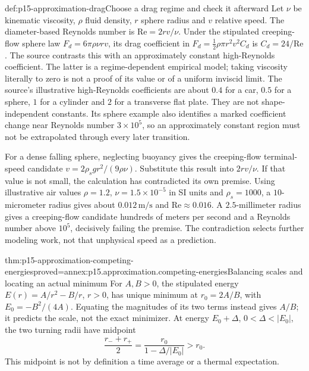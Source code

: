 \begin{hbexample}{def:p15-approximation-drag}{Choose a drag regime and check it afterward}
Let \(\nu\) be kinematic viscosity, \(\rho\) fluid density, \(r\) sphere
radius and \(v\) relative speed. The diameter-based Reynolds number is
\(\mathrm{Re}=2rv/\nu\). Under the stipulated creeping-flow sphere law
\(F_d=6\pi\rho\nu rv\), its drag coefficient in
\(F_d=\tfrac12\rho\pi r^2v^2C_d\) is \(C_d=24/\mathrm{Re}\).
The source contrasts this with an approximately constant high-Reynolds
coefficient. The latter is a regime-dependent empirical model; taking
viscosity literally to zero is not a proof of its value or of a uniform
inviscid limit. The source's illustrative high-Reynolds coefficients are
about \(0.4\) for a car, \(0.5\) for a sphere, \(1\) for a cylinder and
\(2\) for a transverse flat plate. They are not shape-independent constants.
Its sphere example also identifies a marked coefficient change near
Reynolds number \(3\times10^5\), so an approximately constant region
must not be extrapolated through every later transition.

For a dense falling sphere, neglecting buoyancy gives the creeping-flow
terminal-speed candidate \(v=2\rho_sgr^2/(9\rho\nu)\).
Substitute this result into \(2rv/\nu\). If that value is not small, the
calculation has contradicted its own premise. Using illustrative air values
\(\rho=1.2\), \(\nu=1.5\times10^{-5}\) in SI units and
\(\rho_s=1000\), a \(10\)-micrometer radius gives about
\(0.012\,\mathrm{m/s}\) and \(\mathrm{Re}\approx0.016\).
A \(2.5\)-millimeter radius gives a creeping-flow candidate hundreds of
meters per second and a Reynolds number above \(10^5\), decisively failing
the premise. The contradiction selects further modeling work, not that
unphysical speed as a prediction.
\end{hbexample}

\begin{hbtheorem}{thm:p15-approximation-competing-energies}{proved=annex:p15.approximation.competing-energies}{Balancing scales and locating an actual minimum}
For \(A,B>0\), the stipulated energy \(E(r)=A/r^2-B/r\), \(r>0\), has
unique minimum at \(r_0=2A/B\), with \(E_0=-B^2/(4A)\).
Equating the magnitudes of its two terms instead gives \(A/B\); it
predicts the scale, not the exact minimizer.
At energy \(E_0+\Delta\), \(0<\Delta<|E_0|\), the two turning radii have
midpoint
\[
 \frac{r_-+r_+}{2}=\frac{r_0}{1-\Delta/|E_0|}>r_0.
\]
This midpoint is not by definition a time average or a thermal expectation.
\end{hbtheorem}

